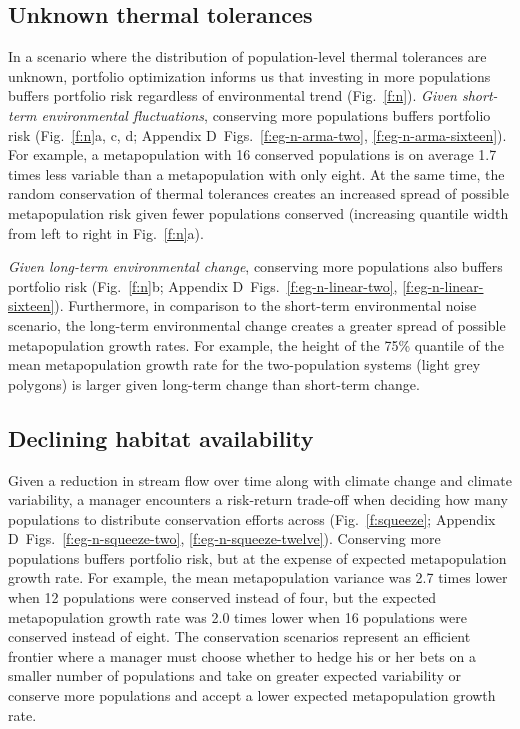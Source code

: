 \documentclass[12pt,english]{article}
\newcommand{\somts}{Appendix D}
\begin{document}
\begin{spacing}{1.9}
\subsection{Unknown thermal tolerances}\label{unknown-thermal-tolerances}

In a scenario where the distribution of population-level thermal tolerances are unknown, portfolio optimization informs us that investing in more populations buffers portfolio risk regardless of environmental trend (Fig.~\ref{f:n}). \emph{Given short-term environmental fluctuations}, conserving more populations buffers portfolio risk (Fig.~\ref{f:n}a, c, d; \somts~Figs.~\ref{f:eg-n-arma-two}, \ref{f:eg-n-arma-sixteen}). For example, a metapopulation with 16 conserved populations is on average 1.7 times less variable than a metapopulation with only eight. At the same time, the random conservation of thermal tolerances creates an increased spread of possible metapopulation risk given fewer populations conserved (increasing quantile width from left to right in Fig.~\ref{f:n}a).

\emph{Given long-term environmental change}, conserving more populations also buffers portfolio risk (Fig.~\ref{f:n}b; \somts~Figs.~\ref{f:eg-n-linear-two}, \ref{f:eg-n-linear-sixteen}). Furthermore, in comparison to the short-term environmental noise scenario, the long-term environmental change creates a greater spread of possible metapopulation growth rates. For example, the height of the 75\% quantile of the mean metapopulation growth rate for the two-population systems (light grey polygons) is larger given long-term change than short-term change.

\subsection{Declining habitat availability}\label{declining-habitat-availability}

Given a reduction in stream flow over time along with climate change and climate variability, a manager encounters a risk-return trade-off when deciding how many populations to distribute conservation efforts across (Fig.~\ref{f:squeeze}; \somts~Figs.~\ref{f:eg-n-squeeze-two}, \ref{f:eg-n-squeeze-twelve}). Conserving more populations buffers portfolio risk, but at the expense of expected metapopulation growth rate. For example, the mean metapopulation variance was 2.7 times lower when 12 populations were conserved instead of four, but the expected metapopulation growth rate was 2.0 times lower when 16 populations were conserved instead of eight. The conservation scenarios represent an efficient frontier where a manager must choose whether to hedge his or her bets on a smaller number of populations and take on greater expected variability or conserve more populations and accept a lower expected metapopulation growth rate.


\end{spacing}
\end{document}
